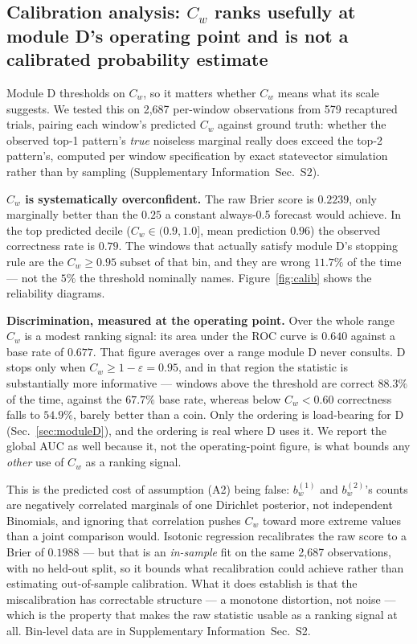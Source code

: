 \documentclass[final,5p,times,longtitle]{elsarticle}
\newcommand{\SI}{Supplementary Information}
\newcommand{\SIcalib}{\SI{}~Sec.~S2}
\newcommand{\Cw}{C_w}
\begin{document}
\subsection{Calibration analysis: $\Cw$ ranks usefully at module D's
operating point and is not a calibrated probability estimate}
\label{sec:calibration}

Module D thresholds on $\Cw$, so it matters whether $\Cw$ means what its
scale suggests. We tested this on 2{,}687 per-window observations from
579 recaptured trials, pairing each window's predicted $\Cw$ against
ground truth: whether the observed top-1 pattern's \emph{true} noiseless
marginal really does exceed the top-2 pattern's, computed per window
specification by exact statevector simulation rather than by sampling
(\SIcalib{}).

\textbf{$\Cw$ is systematically overconfident.} The raw Brier score
\cite{brier1950} is $0.2239$, only marginally better than the $0.25$ a
constant always-0.5 forecast would achieve. In the top predicted decile
($\Cw\in(0.9,1.0]$, mean prediction $0.96$) the observed correctness rate
is $0.79$. The windows that actually satisfy module D's stopping rule are
the $\Cw\ge0.95$ subset of that bin, and they are wrong $11.7\%$ of the
time --- not the $5\%$ the threshold nominally names.
Figure~\ref{fig:calib} shows the reliability diagrams.

\textbf{Discrimination, measured at the operating point.} Over the whole
range $\Cw$ is a modest ranking signal: its area under the ROC curve is
$0.640$ against a base rate of $0.677$. That figure averages over a range
module D never consults. D stops only when $\Cw\ge1-\varepsilon=0.95$, and
in that region the statistic is substantially more informative --- windows
above the threshold are correct $88.3\%$ of the time, against the $67.7\%$
base rate, whereas below $\Cw<0.60$ correctness falls to $54.9\%$, barely
better than a coin. Only the ordering is load-bearing for D
(Sec.~\ref{sec:moduleD}), and the ordering is real where D uses it. We
report the global AUC as well because it, not the operating-point figure,
is what bounds any \emph{other} use of $\Cw$ as a ranking signal.


This is the predicted cost of assumption (A2) being false: $b^{(1)}_w$
and $b^{(2)}_w$'s counts are negatively correlated marginals of one
Dirichlet posterior, not independent Binomials, and ignoring that
correlation pushes $\Cw$ toward more extreme values than a joint
comparison would. Isotonic regression \cite{zadrozny2002} recalibrates
the raw score to a Brier of $0.1988$ --- but that is an \emph{in-sample}
fit on the same 2{,}687 observations, with no held-out split, so it bounds
what recalibration could achieve rather than estimating out-of-sample
calibration. What it does establish is that the miscalibration has
correctable structure --- a monotone distortion, not noise --- which is
the property that makes the raw statistic usable as a ranking signal at
all. Bin-level data are in \SIcalib{}.
\end{document}
